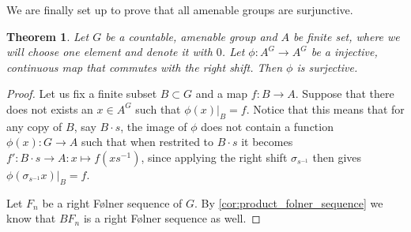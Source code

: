 \documentclass[titlepage, a4paper]{article}
\theoremstyle{theoremdd}
\newtheorem{theorem}{Theorem}[section]
\theoremstyle{definition}
\theoremstyle{remark}
\begin{document}
We are finally set up to prove that all amenable groups are surjunctive.
\begin{theorem}
	Let $G$ be a countable, amenable group and  $A$ be finite set, where we will choose one element and denote it with $0$. Let  $\phi: A^{G} \to A^{G}$ be a injective, continuous map that commutes with the right shift. Then $\phi$ is surjective.
\end{theorem}

\begin{proof}
	Let us fix a finite subset $B \subset G$ and a map $f:B\to A$. 
	Suppose that there does not exists an $x \in A^{G}$ such that $\phi(x)|_B = f$.
	Notice that this means that for any copy of $B$, say  $B\cdot s$, the image of $\phi$ does not contain a function  $\phi(x): G \to A$ such that when restrited to  $B\cdot s$ it becomes $f': B\cdot s \to A: x \mapsto f\left( x s^{-1} \right) $, since applying the right shift $\sigma_{s^{-1}}$ then gives $\phi(\sigma_{s^{-1}} x) |_{B} = f$.

	Let $F_n$ be a right Følner sequence of $G$. By \cref{cor:product_folner_sequence} we know that $BF_n$ is a right Følner sequence as well. 


\end{proof}
\end{document}
